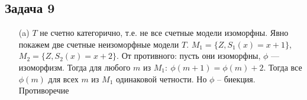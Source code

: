 \subsection*{Задача 9}
\begin{enumerate}
\item[(a)]
	$T$ не счетно категорично, т.е. не все счетные модели изоморфны. Явно покажем две счетные неизоморфные модели $T$. $M_1 = \{Z, S_1(x) = x + 1\}$, $M_2 = \{Z, S_2(x) = x + 2\}$. От противного: пусть они изоморфны, $\phi$ — изоморфизм. Тогда для любого $m$ из $M_1:\ \phi(m + 1) = \phi(m) + 2$. Тогда все $\phi(m)$ для всех $m$ из $M_1$ одинаковой четности. Но $\phi$ -- биекция. Противоречие
\end{enumerate}
